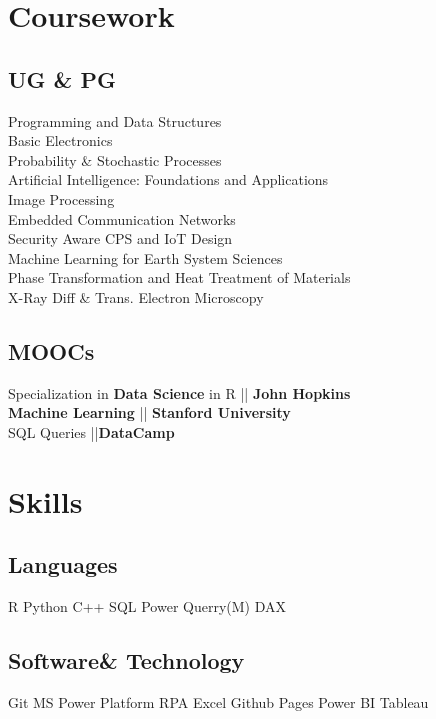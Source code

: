 \documentclass[]{deedy-resume-openfont}
\begin{document}
\begin{minipage}[t]{0.33\textwidth}

\section{Coursework}
\subsection{UG \& PG}
\textbullet{}Programming and Data Structures\\
\textbullet{}Basic Electronics\\
\textbullet{}Probability \& Stochastic Processes\\
\textbullet{}Artificial Intelligence: Foundations and Applications\\
\textbullet{}Image Processing\\
\textbullet{}Embedded Communication Networks\\
\textbullet{}Security Aware CPS and IoT Design\\
\textbullet{}Machine Learning for Earth System Sciences\\
\textbullet{}Phase Transformation and Heat Treatment of Materials\\
\textbullet{}X-Ray Diff \& Trans. Electron Microscopy
\sectionsep
\subsection{MOOCs}
\textbullet{}Specialization in \textbf{Data Science} in R || \textbf{John Hopkins}\\
\textbullet{}\textbf{Machine Learning} || \textbf{Stanford University}\\
\textbullet{}SQL Queries ||\textbf{DataCamp}
\sectionsep

\section{Skills}
\subsection{Languages}
R \textbullet{}  Python \textbullet{} C++
\textbullet{} SQL
\textbullet{} Power Querry(M)
\textbullet{} DAX
\sectionsep
\subsection{Software\& Technology}
Git \textbullet{} MS Power Platform \textbullet{} RPA \textbullet{} Excel \textbullet{} Github Pages \textbullet{} Power BI \textbullet{} Tableau
\sectionsep


\end{minipage}
\end{document}
